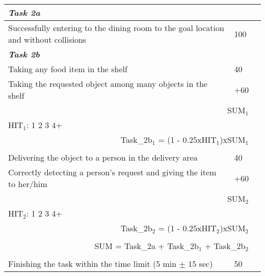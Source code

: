 \documentclass{article}
\begin{document}
\begin{center}
\begin{tabular}{ |m{8cm}|m{3cm}|m{1cm}| } 
    \hline
    \multicolumn{3}{|l|}{\textbf{\textit{Task 2a}}} \\ 
    \hline
    Successfully entering to the dining room to the goal location and without collisions & 100 & \\ 
    \hline
    \multicolumn{3}{|l|}{\textbf{\textit{Task 2b}}} \\ 
    \hline
    Taking any food item in the shelf & 40 & \\ 
    \hline
    Taking the requested object among many objects in the shelf & +60 & \\ 
    \hline
    \multicolumn{2}{|r|}{SUM$_1$  } &\\
    \hline
    \multicolumn{3}{|l|}{HIT$_1$:\hspace*{2cm} 1\hspace*{2cm} 2\hspace*{2cm} 3\hspace*{2cm} 4+} \\ 
    \hline
    \multicolumn{2}{|r|}{Task\_2b$_1$ = (1 - 0.25xHIT$_1$)xSUM$_1$} &\\
    \hline
    \multicolumn{3}{|l|}{}\\
    \hline
    Delivering the object to a person in the delivery area & 40 & \\ 
    \hline
    Correctly detecting a person's request and giving the item to her/him & +60 & \\ 
    \hline
    \multicolumn{2}{|r|}{SUM$_2$  } &\\
    \hline
    \multicolumn{3}{|l|}{HIT$_2$:\hspace*{2cm} 1\hspace*{2cm} 2\hspace*{2cm} 3\hspace*{2cm} 4+} \\ 
    \hline
    \multicolumn{2}{|r|}{Task\_2b$_2$ = (1 - 0.25xHIT$_2$)xSUM$_2$} &\\
    \hline
    \multicolumn{3}{|l|}{}\\
    \hline
    \multicolumn{2}{|r|}{SUM = Task\_2a + Task\_2b$_1$ + Task\_2b$_2$  } &\\
    \hline
    \multicolumn{3}{|l|}{}\\
    \hline
    Finishing the task within the time limit (5 min $\pm$ 15 sec) & 50 & \\ 
    \hline

\end{tabular}
\end{center}
\end{document}
